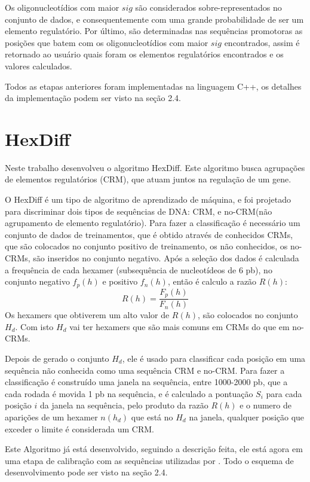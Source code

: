 Os oligonucleotídios com maior $sig$ são considerados sobre-representados no conjunto de dados, e consequentemente com uma grande probabilidade de ser um elemento regulatório. Por último, são determinadas nas sequências promotoras as posições que batem com os oligonucleotídios com maior $sig$ encontrados, assim é retornado ao usuário quais foram os elementos regulatórios encontrados e os valores calculados.

Todos as etapas anteriores foram implementadas na linguagem C++, os detalhes da implementação podem ser visto na seção 2.4.

\section{HexDiff}

Neste trabalho \cite{Chan2005} desenvolveu o algoritmo HexDiff. Este algoritmo busca agrupações de elementos regulatórios (CRM), que atuam juntos na regulação de um gene.

O HexDiff é um tipo de algoritmo de aprendizado de máquina, e foi projetado para discriminar dois tipos de sequências de DNA: CRM, e no-CRM(não agrupamento de elemento regulatório). Para fazer a classificação é necessário um conjunto de dados de treinamentos, que é obtido através de conhecidos CRMs, que são colocados no conjunto positivo de treinamento, os não conhecidos, os no-CRMs, são inseridos no conjunto negativo. Após a seleção dos dados é calculada a frequência de cada hexamer (subsequência de nucleotídeos de 6 pb), no conjunto negativo $f_{p}(h)$ e positivo $f_{n}(h)$, então é calculo a razão $R(h)$:
\begin{equation}
R(h) = \frac{F_{p}(h)}{F_{n}(h)}
\end{equation}
Os hexamers que obtiverem um alto valor de $R(h)$, são colocados no conjunto $H_{d}$. Com isto $H_{d}$ vai ter hexamers que são mais comuns em CRMs do que em  no-CRMs.

Depois de gerado o conjunto $H_{d}$, ele é usado para classificar cada posição em uma sequência não conhecida como uma sequência CRM e no-CRM. Para fazer a classificação é construído uma janela na sequência, entre 1000-2000 pb, que a cada rodada é movida 1 pb na sequência, e é calculado a pontuação $S_{i}$ para cada posição $i$ da janela na sequência, pelo produto da razão $R(h)$ e o numero de aparições de um hexamer $n(h_{d})$ que está no $H_{d}$ na janela, qualquer posição que exceder o limite é considerada um CRM.

Este Algoritmo já está desenvolvido, seguindo a descrição feita, ele está agora em uma etapa de calibração com as sequências utilizadas por \cite{Chan2005}. Todo o esquema de desenvolvimento pode ser visto na seção 2.4.


